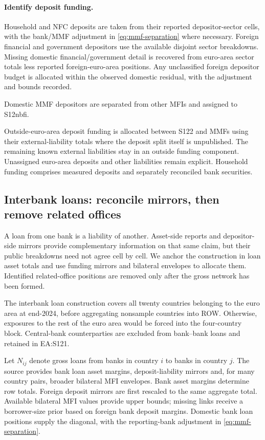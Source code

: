 \paragraph{Identify deposit funding.}
Household and NFC deposits are taken from their reported depositor-sector cells, with the bank/MMF adjustment in \eqref{eq:mmf-separation} where necessary. Foreign financial and government depositors use the available disjoint sector breakdowns. Missing domestic financial/government detail is recovered from euro-area sector totals less reported foreign-euro-area positions. Any unclassified foreign depositor budget is allocated within the observed domestic residual, with the adjustment and bounds recorded. 

Domestic MMF depositors are separated from other MFIs and assigned to S12nbfi.

Outside-euro-area deposit funding is allocated between S122 and MMFs using their external-liability totals where the deposit split itself is unpublished. The remaining known external liabilities stay in an outside funding component. Unassigned euro-area deposits and other liabilities remain explicit. Household funding comprises measured deposits and separately reconciled bank securities.

\subsection{Interbank loans: reconcile mirrors, then remove related offices}

A loan from one bank is a liability of another. Asset-side reports and depositor-side mirrors provide complementary information on that same claim, but their public breakdowns need not agree cell by cell. We anchor the construction in loan asset totals and use funding mirrors and bilateral envelopes to allocate them. Identified related-office positions are removed only after the gross network has been formed.

The interbank loan construction covers all twenty countries belonging to the euro area at end-2024, before aggregating nonsample countries into ROW. Otherwise, exposures to the rest of the euro area would be forced into the four-country block. Central-bank counterparties are excluded from bank--bank loans and retained in EA:S121.

Let $N_{ij}$ denote gross loans from banks in country $i$ to banks in country $j$. The source provides bank loan asset margins, deposit-liability mirrors and, for many country pairs, broader bilateral MFI envelopes. Bank asset margins determine row totals. Foreign deposit mirrors are first rescaled to the same aggregate total. Available bilateral MFI values provide upper bounds; missing links receive a borrower-size prior based on foreign bank deposit margins. Domestic bank loan positions supply the diagonal, with the reporting-bank adjustment in \eqref{eq:mmf-separation}.

